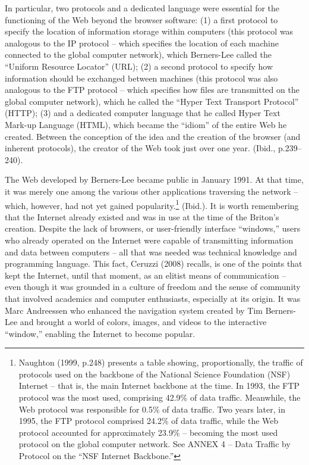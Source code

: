 In particular, two protocols and a dedicated language were essential for the functioning of the Web beyond the browser software: (1) a first protocol to specify the location of information storage within computers (this protocol was analogous to the IP protocol -- which specifies the location of each machine connected to the global computer network), which Berners-Lee called the ``Uniform Resource Locator'' (URL); (2) a second protocol to specify how information should be exchanged between machines (this protocol was also analogous to the FTP protocol -- which specifies how files are transmitted on the global computer network), which he called the ``Hyper Text Transport Protocol'' (HTTP); (3) and a dedicated computer language that he called Hyper Text Mark-up Language (HTML), which became the ``idiom'' of the entire Web he created. Between the conception of the idea and the creation of the browser (and inherent protocols), the creator of the Web took just over one year. (Ibid., p.239--240).

The Web developed by Berners-Lee became public in January 1991. At that time, it was merely one among the various other applications traversing the network -- which, however, had not yet gained popularity.\footnote{Naughton (1999, p.248) presents a table showing, proportionally, the traffic of protocols used on the backbone of the National Science Foundation (NSF) Internet -- that is, the main Internet backbone at the time. In 1993, the FTP protocol was the most used, comprising 42.9\% of data traffic. Meanwhile, the Web protocol was responsible for 0.5\% of data traffic. Two years later, in 1995, the FTP protocol comprised 24.2\% of data traffic, while the Web protocol accounted for approximately 23.9\% -- becoming the most used protocol on the global computer network. See ANNEX 4 -- Data Traffic by Protocol on the ``NSF Internet Backbone.''} (Ibid.). It is worth remembering that the Internet already existed and was in use at the time of the Briton's creation. Despite the lack of browsers, or user-friendly interface ``windows,'' users who already operated on the Internet were capable of transmitting information and data between computers -- all that was needed was technical knowledge and programming language. This fact, Ceruzzi (2008) recalls, is one of the points that kept the Internet, until that moment, as an elitist means of communication -- even though it was grounded in a culture of freedom and the sense of community that involved academics and computer enthusiasts, especially at its origin. It was Marc Andreessen who enhanced the navigation system created by Tim Berners-Lee and brought a world of colors, images, and videos to the interactive ``window,'' enabling the Internet to become popular.

